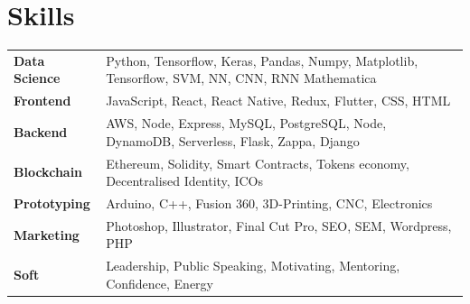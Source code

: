 \documentclass[11pt]{article}
\begin{document}
\section*{Skills}
\begin{tabularx}{\textwidth}{lX}
  \textbf{Data Science} & Python, Tensorflow, Keras, Pandas, Numpy, Matplotlib, Tensorflow, SVM,
                          NN, CNN, RNN
                          Mathematica \\
  \textbf{Frontend}     & JavaScript, React, React Native, Redux, Flutter, CSS, HTML  \\
  \textbf{Backend}      & AWS, Node, Express, MySQL, PostgreSQL, Node, DynamoDB,
                          Serverless, Flask, Zappa, Django \\
  \textbf{Blockchain}   & Ethereum, Solidity, Smart Contracts, Tokens economy,
                          Decentralised Identity, ICOs \\
  \textbf{Prototyping}  & Arduino, C++, Fusion 360, 3D-Printing, CNC, Electronics \\
  \textbf{Marketing}    & Photoshop, Illustrator, Final Cut Pro, SEO, SEM, Wordpress, PHP \\
  \textbf{Soft}         & Leadership, Public Speaking, Motivating, Mentoring, Confidence, Energy
\end{tabularx}
\end{document}
